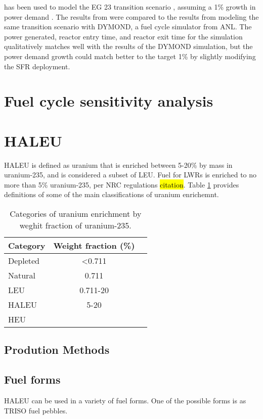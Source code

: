 \Cyclus has been used to model the EG 23 transition scenario 
\cite{wigeland_nuclear_2014}, assuming a 1\% growth in power demand 
\cite{djokic_application_2015}. The results from \Cyclus were compared 
to the results from modeling the same transition scenario with DYMOND, 
a fuel cycle simulator from \gls{ANL}. The power generated, reactor entry 
time, and reactor exit time for the \Cyclus simulation qualitatively 
matches well with the results of the DYMOND simulation, but the power 
demand growth could match better to the target 1\% by slightly modifying 
the \gls{SFR} deployment. 

\section{Fuel cycle sensitivity analysis}

\section{HALEU}
\gls{HALEU} is defined as uranium that is enriched between 5-20\% by mass in 
uranium-235, and is considered a subset of \gls{LEU}. Fuel for \glspl{LWR} 
is enriched to no more than 5\% uranium-235, per \gls{NRC} regulations 
\hl{citation}. Table \ref{tab:enrichemnt} provides definitions of some of the 
main classifications of uranium enrichemnt. 

\begin{table}
    \centering
    \caption{Categories of uranium enrichment by weghit fraction of 
    uranium-235.}
    \label{tab:enrichemnt}
    \begin{tabular}{l c c}
        \hline
        Category & Weight fraction (\%)\\\hline
        Depleted & <0.711 \\
        Natural & 0.711 \\
        \gls{LEU} & 0.711-20 \\
        \gls{HALEU} & 5-20 \\
        \gls{HEU} & \ge 20 \\
        \hline
    \end{tabular}
\end{table}

\subsection{Prodution Methods}

\subsection{Fuel forms}
\gls{HALEU} can be used in a variety of fuel forms. One of the possible 
forms is as \gls{TRISO} fuel pebbles. 

